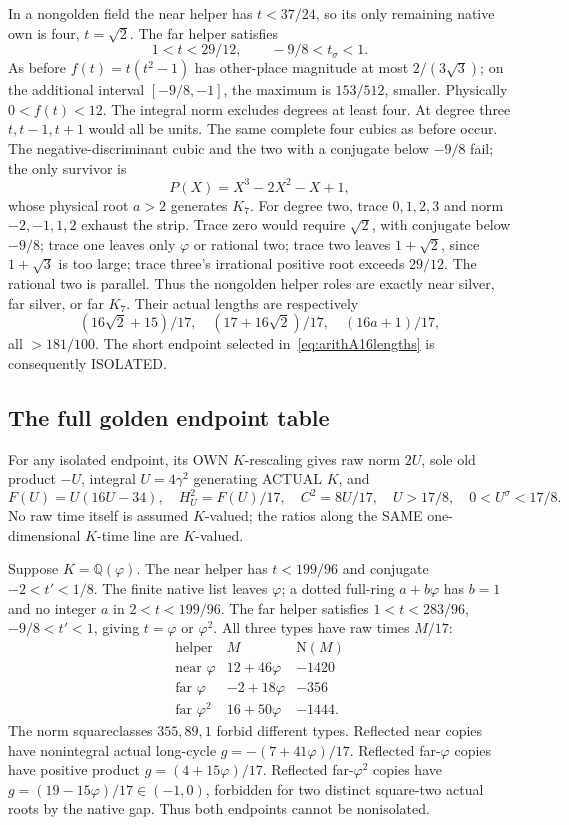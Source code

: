 In a nongolden field the near helper has \(t<37/24\),
so its only remaining native own is four, \(t=\sqrt2\).
The far helper satisfies
\[
                    1<t<29/12,\qquad -9/8<t_\sigma<1.
\]
As before \(f(t)=t(t^2-1)\) has other-place magnitude at most
\(2/(3\sqrt3)\); on the additional interval
\([-9/8,-1]\), the maximum is \(153/512\), smaller.
Physically \(0<f(t)<12\).
The integral norm excludes degrees at least four.
At degree three \(t,t-1,t+1\) would all be units.
The same complete four cubics as before occur.
The negative-discriminant cubic and the two with a conjugate
below \(-9/8\) fail; the only survivor is
\[
                P(X)=X^3-2X^2-X+1,
\]
whose physical root \(a>2\) generates \(K_7\).
For degree two, trace \(0,1,2,3\) and norm
\(-2,-1,1,2\) exhaust the strip.
Trace zero would require \(\sqrt2\), with conjugate below
\(-9/8\); trace one leaves only \(\varphi\) or rational two;
trace two leaves \(1+\sqrt2\), since \(1+\sqrt3\) is too large;
trace three's irrational positive root exceeds \(29/12\).
The rational two is parallel.
Thus the nongolden helper roles are exactly near silver,
far silver, or far \(K_7\).
Their actual lengths are respectively
\[
 (16\sqrt2+15)/17,\quad (17+16\sqrt2)/17,\quad
 (16a+1)/17,
\]
all \(>181/100\).
The short endpoint selected in~\eqref{eq:arithA16lengths}
is consequently ISOLATED.

\subsection{The full golden endpoint table}
\label{app:arithA16golden}

For any isolated endpoint, its OWN \(K\)-rescaling gives
raw norm \(2U\), sole old product \(-U\), integral \(U=4\gamma^2\)
generating ACTUAL \(K\), and
\[
 F(U)=U(16U-34),\quad H_U^2=F(U)/17,\quad C^2=8U/17,
 \quad U>17/8,\quad0<U^\sigma<17/8 .
\tag{A16U}\label{eq:arithA16U}
\]
No raw time itself is assumed \(K\)-valued; the ratios along
the SAME one-dimensional \(K\)-time line are \(K\)-valued.

Suppose \(K=\mathbb Q(\varphi)\).
The near helper has \(t<199/96\) and conjugate
\(-2<t'<1/8\).  The finite native list leaves \(\varphi\);
a dotted full-ring \(a+b\varphi\) has \(b=1\) and no integer
\(a\) in \(2<t<199/96\).
The far helper satisfies \(1<t<283/96\), \(-9/8<t'<1\),
giving \(t=\varphi\) or \(\varphi^2\).
All three types have raw times \(M/17\):
\[
\begin{array}{c|c|r}
\text{helper}&M&\mathrm N(M)\\ \hline
\text{near }\varphi&12+46\varphi&-1420\\
\text{far }\varphi&-2+18\varphi&-356\\
\text{far }\varphi^2&16+50\varphi&-1444 .
\end{array}
\]
The norm squareclasses \(355,89,1\) forbid different types.
Reflected near copies have nonintegral actual long-cycle
\(g=-(7+41\varphi)/17\).
Reflected far-\(\varphi\) copies have positive product
\(g=(4+15\varphi)/17\).
Reflected far-\(\varphi^2\) copies have
\(g=(19-15\varphi)/17\in(-1,0)\), forbidden for two
distinct square-two actual roots by the native gap.
Thus both endpoints cannot be nonisolated.

